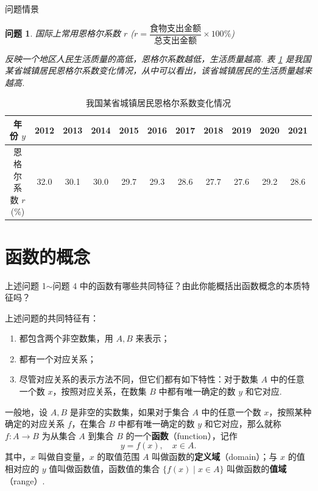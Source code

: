 \documentclass[aspectratio=169,13pt,t] {beamer}
\newtheorem{question}{问题}
\theoremstyle{definition}
\begin{document}
\begin{frame}{问题情景}
	\begin{question}
		 国际上常用恩格尔系数 \(r\) {\upshape (\(r = \dfrac{\text{食物支出金额}}{\text{总支出金额}} \times 100\%\))}\rule[-15pt]{0pt}{2pt} 反映一个地区人民生活质量的高低，恩格尔系数越低，生活质量越高. 表 \ref{table:tab1} 是我国某省城镇居民恩格尔系数变化情况，从中可以看出，该省城镇居民的生活质量越来越高.
	\end{question}
	
	
	\begin{table}[h]
		\centering	
		\renewcommand{\arraystretch}{1.3}
		
		\begin{tabular}{|c|c|c|c|c|c|c|c|c|c|c|}
			\hline
			年份 \(y\) & 2012 & 2013 & 2014 & 2015 & 2016 & 2017 & 2018	& 2019 & 2020 & 2021 \\ \hline
			恩格尔系数 \(r\) (\%) & 32.0 & 30.1 & 30.0 & 29.7 & 29.3 & 28.6 & 27.7 & 27.6 & 29.2 & 28.6 \\ \hline
		\end{tabular}
		\caption {我国某省城镇居民恩格尔系数变化情况}
		\label{table:tab1}
	\end{table}
\end{frame}

\section{函数的概念}
\begin{frame}
	\begin{summarybox}[归纳]
		上述问题 1\(\sim\)问题 4 中的函数有哪些共同特征？由此你能概括出函数概念的本质特征吗？
	\end{summarybox}
	\pause
\begin{summarybox-answer}
	上述问题的共同特征有：
	\begin{enumerate}[(\arabic*)]
		\item 都包含两个非空数集，用 \(A, B\) 来表示；
		\item 都有一个对应关系；
		\item 尽管对应关系的表示方法不同，但它们都有如下特性：对于数集 \(A\) 中的任意一个数 \(x\)，按照对应关系，在数集 \(B\) 中都有唯一确定的数 \(y\) 和它对应.
	\end{enumerate}
\end{summarybox-answer}		

\end{frame}

\begin{frame}
	\begin{definition}[函数的定义]
		一般地，设 \(A, B\) 是非空的实数集，如果对于集合 \(A\) 中的任意一个数 \(x\)，按照某种确定的对应关系 \(f\)，在集合 \(B\) 中都有唯一确定的数 \(y\) 和它对应，那么就称 \(f: A \to B\) 为从集合 \(A\) 到集合 \(B\) 的一个\textbf{函数}（function），记作
		\[
		y = f(x), \quad x \in A.
		\]
		其中，\(x\) 叫做自变量，\(x\) 的取值范围 \(A\) 叫做函数的\textbf{定义域}（domain）；与 \(x\) 的值相对应的 \(y\) 值叫做函数值，函数值的集合 \(\{f(x) \mid x \in A\}\) 叫做函数的\textbf{值域}（range）.
	\end{definition}

		
		

\end{frame}
\end{document}
